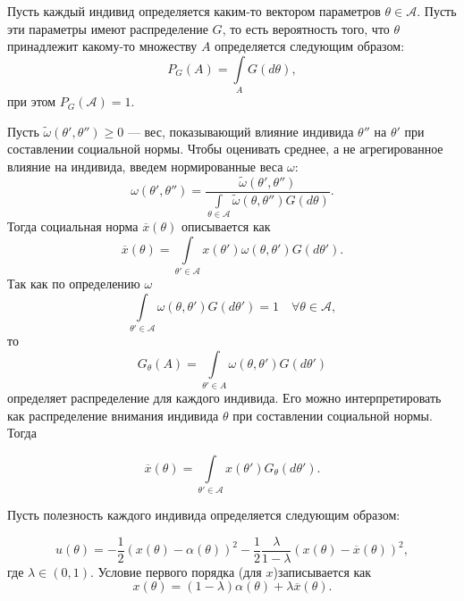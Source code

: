 \documentclass[12pt]{article}
\begin{document}
Пусть каждый индивид определяется каким-то вектором параметров $\theta \in \mathcal{A}$.  Пусть эти параметры имеют распределение $G$,  то есть вероятность того,  что $\theta$ принадлежит какому-то множеству $A$ определяется следующим образом:
$$
P_G(A) = \int\limits_A G(d \theta),
$$
при этом $P_G(\mathcal{A}) =1$.
 
Пусть $\tilde{\omega}(\theta', \theta'') \geqslant 0$ --- вес,  показывающий влияние индивида $\theta''$ на $\theta'$ при составлении социальной нормы.  Чтобы оценивать среднее, а не агрегированное влияние на индивида,  введем нормированные веса $\omega$:
$$
\omega(\theta', \theta'') = \frac{\tilde{\omega}(\theta', \theta'')}{\int\limits_{\theta \in \mathcal{A}} \tilde{\omega}(\theta, \theta'')G(d \theta)} .
$$
Тогда социальная норма $\overline{x}(\theta)$ описывается как
$$
\overline{x}(\theta) = \int\limits_{\theta' \in \mathcal{A}} x(\theta') \omega(\theta, \theta') G(d \theta').
$$
Так как по определению $\omega$
$$
\int\limits_{\theta' \in \mathcal{A}} \omega(\theta, \theta') G(d \theta') = 1 \quad \forall \theta \in \mathcal{A},
$$
то
$$
G_\theta (A) = \int\limits_{\theta' \in A} \omega(\theta, \theta') G(d \theta')
$$
определяет распределение для каждого индивида. Его можно интерпретировать как распределение внимания индивида $\theta$ при составлении социальной нормы.  Тогда

$$
\overline{x}(\theta) =  \int\limits_{\theta' \in \mathcal{A}} x(\theta') G_\theta(d \theta').
$$

Пусть полезность каждого индивида определяется следующим образом:

\begin{equation*}
u(\theta) = -\frac{1}{2}(x(\theta)-\alpha(\theta))^2-\frac{1}{2}\frac{\lambda}{1-\lambda}\left(x(\theta) - \overline{x}(\theta)\right)^2,
\end{equation*}
где $\lambda \in (0, 1)$.  Условие первого порядка (для $x$)записывается как
\begin{equation}
\label{eq: x}
x(\theta) = (1-\lambda)\alpha(\theta) + \lambda \overline{x}(\theta).
\end{equation}
\end{document}
